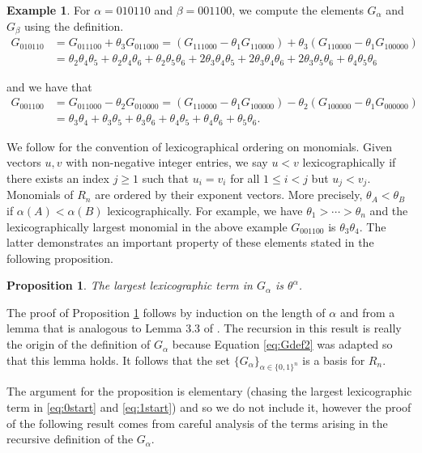 \documentclass[11pt,oneside]{amsart}
\newtheorem{prop}[theorem]{Proposition}
\theoremstyle{definition}
\newtheorem{example}[theorem]{Example}
\numberwithin{equation}{section}
\begin{document}
\begin{example} For $\alpha = 010110$ and $\beta = 001100$, we compute
the elements $G_\alpha$ and $G_\beta$ using the definition.
\begin{align*}
G_{010110} &= G_{011100} + \theta_3 G_{011000} = (G_{111000} - \theta_1 G_{110000})
+ \theta_3(G_{110000} - \theta_1 G_{100000})\\
&= \theta_2 \theta_4 \theta_5 + \theta_2 \theta_4 \theta_6 + \theta_2 \theta_5 \theta_6
+ 2 \theta_3 \theta_4 \theta_5 + 2 \theta_3 \theta_4 \theta_6 + 2 \theta_3 \theta_5 \theta_6
+ \theta_4 \theta_5 \theta_6
\end{align*}

and we have that
\begin{align*}
G_{001100} &= G_{011000} - \theta_2 G_{010000} = (G_{110000} - \theta_1 G_{100000})
- \theta_2 (G_{100000} - \theta_1 G_{000000})\\
&= \theta_3 \theta_4 + \theta_3 \theta_5 + \theta_3 \theta_6 + \theta_4 \theta_5 + \theta_4 \theta_6 + \theta_5 \theta_6.
\end{align*}
\end{example}

We follow \cite{CLO} for the convention of lexicographical ordering on monomials.
Given vectors $u,v$ with non-negative integer entries, we say $u < v$ lexicographically if
there exists an index $j \ge 1$ such that $u_{i} = v_{i}$ for all $1 \le i < j$ but
$u_{j} < v_{j}$.  Monomials of $R_{n}$ are ordered by their exponent vectors.  More
precisely, $\theta_{A} < \theta_{B}$ if $\alpha(A) < \alpha(B)$ lexicographically.  For example, we have
$\theta_{1} > \cdots > \theta_{n}$ and the lexicographically largest monomial in the above example
$G_{001100}$ is $\theta_{3}\theta_{4}$.  The latter demonstrates an important property of these
elements stated in the following proposition.
\begin{prop}\label{prop:largest}
The largest lexicographic term in $G_\alpha$ is $\theta^\alpha$.
\end{prop}

The proof of Proposition \ref{prop:largest} follows by induction
on the length of $\alpha$ and
from a lemma that is analogous to Lemma 3.3 of \cite{AB}.
The recursion in this result is really the origin of the definition
of $G_\alpha$ because Equation \eqref{eq:Gdef2}
was adapted so that this lemma holds.  It follows that
the set $\{ G_\alpha \}_{\alpha \in \{0,1\}^n}$ is a basis
for $R_n$.

The argument for the proposition is elementary (chasing the largest lexicographic
term in \eqref{eq:0start} and \eqref{eq:1start})
and so we do not include it, however the proof of the
following result comes from careful analysis of the
terms arising in the recursive definition of the $G_\alpha$.
\end{document}
